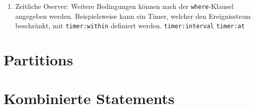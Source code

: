 \begin{enumerate}
	\begin{lstlisting}[caption={Pattern mit Follow-Operator }\label{follow_pattern},captionpos=t,language=SQL]
	
	every a = GameAction(action="FOLD") -> b =
	 GameEnd(a.playerName != b.playerName)
	
	\end{lstlisting}
	
	\item Zeitliche Oserver:
	Weitere Bedingungen können nach der \texttt{where}-Klausel angegeben werden. Beispielsweise kann ein Timer, welcher den Ereignisstrom beschränkt, mit \texttt{timer:within} definiert werden.
	\texttt{timer:interval}
	\texttt{timer:at}
\end{enumerate}


\section{Partitions}

\section{Kombinierte Statements}